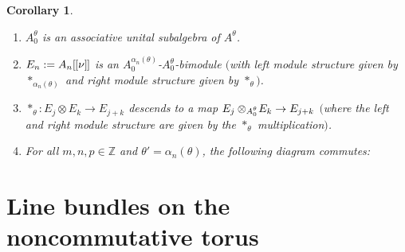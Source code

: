 \documentclass[10pt,a4paper]{amsart}
\numberwithin{equation}{section}
\newtheorem{cor}[thm]{Corollary}
\theoremstyle{definition}
\newcommand{\Z}{\mathbb{Z}}
\newcommand{\id}{\mathsf{id}}
\newcommand{\lbrak}{[\hspace{-0.5pt}[}
\newcommand{\rbrak}{]\hspace{-0.5pt}]}
\renewcommand{\hbar}{\nu}
\begin{document}
\begin{cor}\label{cor:3.3} \quad
\begin{enumerate}\itemsep=0pt
\item[$1)$]
$A_0^{\theta}$ is an associative unital subalgebra of $A^{\theta}$.

\item[$2)$]
$E_n:=A_n\lbrak\hbar\rbrak$ is an $A_0^{\alpha_n(\theta)}$-$A_0^{\theta}$-bimodule $($with left module structure given by $\ast_{\alpha_n(\theta)}$ and right module structure given by $\ast_\theta)$.

\item[$3)$]
$ \ast_\theta\colon E_j\otimes E_k\to E_{j+k}$ descends to a map
$E_j\otimes_{\smash[t]{A_0^{\theta}}}\! E_k\to E_{j+k}$ $($where the left and right module structure are given by the $\ast_\theta$ multiplication$)$.

\item[$4)$]
For all $m,n,p\in\Z$ and
$\theta'=\alpha_n(\theta)$, the following diagram commutes:
\begin{center}
\end{center}
\end{enumerate}
\end{cor}

\section{Line bundles on the noncommutative torus}\label{sec:4}
\end{document}
